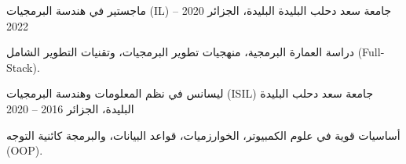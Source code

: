 
\begin{cventries}
  \cventry
    {\textarabic{ماجستير في هندسة البرمجيات} (\textenglish{IL})}
    {\textarabic{جامعة سعد دحلب البليدة}}
    {\textarabic{البليدة، الجزائر}}
    {2020 -- 2022}
    {
      \begin{cvitems}
        \item {\textarabic{دراسة العمارة البرمجية، منهجيات تطوير البرمجيات، وتقنيات التطوير الشامل} (\textenglish{Full-Stack}).}
      \end{cvitems}
    }

  \cventry
    {\textarabic{ليسانس في نظم المعلومات وهندسة البرمجيات} (\textenglish{ISIL})}
    {\textarabic{جامعة سعد دحلب البليدة}}
    {\textarabic{البليدة، الجزائر}}
    {2016 -- 2020}
    {
      \begin{cvitems}
        \item {\textarabic{أساسيات قوية في علوم الكمبيوتر، الخوارزميات، قواعد البيانات، والبرمجة كائنية التوجه} (\textenglish{OOP}).}
      \end{cvitems}
    }
\end{cventries}
